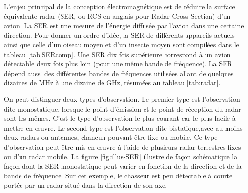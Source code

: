 \paragraph{}

L'enjeu principal de la conception électromagnétique est de réduire la surface équivalente radar (SER, ou RCS en anglais pour Radar Cross Section) d'un avion. La SER est une mesure de l'énergie diffusée par l'avion dans une certaine direction. Pour donner un ordre d'idée, la SER de différents appareils actuels ainsi que celle d'un oiseau moyen et d'un insecte moyen sont compilées dans le tableau \ref{tab:SERcomp}. Une SER dix fois supérieure correspond à un avion détectable deux fois plus loin (pour une même bande de fréquence). La SER dépend aussi des différentes bandes de fréquences utilisées allant de quelques dizaines de MHz à une dizaine de GHz, résumées au tableau \ref{tab:radar}.

On peut distinguer deux types d'observation. Le premier type est l'observation dite monostatique, lorsque le point d'émission et le point de réception du radar sont les mêmes. C'est le type d'observation le plus courant car le plus facile à mettre en \oe uvre. Le second type est l'observation dite bistatique,avec au moins deux radars ou antennes, chancun pouvant être fixe ou mobile. Ce type d'observation peut être mis en \oe uvre à l'aide de plusieurs radar terrestres fixes ou d'un radar mobile.
La figure \ref{fig:illus-SER} illustre de façon schématique la façon dont la SER monostatique peut varier en fonction de la direction et de la bande de fréquence. Sur cet exemple, le chasseur est peu détectable à courte portée par un radar situé dans la direction de son axe.

